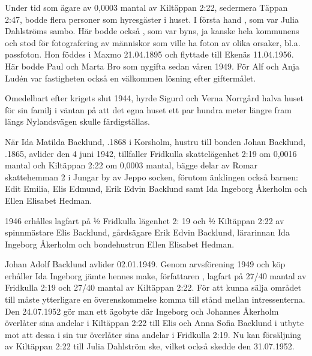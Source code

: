 Under  tid som ägare av 0,0003 mantal av Kiltäppan 2:22, sedermera Täppan 2:47, bodde flera personer som hyresgäster i huset. I första hand , som var Julia Dahlströms sambo. Här bodde också , som var byns, ja kanske hela kommunens  och stod för fotografering av människor som ville ha foton av olika orsaker, bl.a. passfoton. Hon föddes i Maxmo 21.04.1895 och flyttade till Ekenäs 11.04.1956. Här bodde Paul och Marta Bro som nygifta sedan våren 1949. För Alf och Anja Ludén var fastigheten också en välkommen lösning efter giftermålet.

Omedelbart efter krigets slut 1944, hyrde Sigurd och Verna Norrgård halva huset för sin familj i väntan på att det egna huset ett par hundra meter längre fram längs Nylandsvägen skulle färdigställas.




När Ida Matilda Backlund, .1868 i Korsholm, hustru till bonden Johan Backlund, .1865, avlider den 4 juni 1942, tillfaller Fridkulla skattelägenhet 2:19 om 0,0016 mantal och Kiltäppan 2:22 om 0,0003 mantal, bägge delar av Romar skattehemman 2 i Jungar by av Jeppo socken, förutom änklingen också barnen: Edit Emilia, Elis Edmund, Erik Edvin Backlund samt Ida Ingeborg Åkerholm och Ellen Elisabet Hedman.

1946 erhålles lagfart på ½ Fridkulla lägenhet 2: 19 och ½ Kiltäppan 2:22 av spinnmästare Elis Backlund, gårdsägare Erik Edvin Backlund, lärarinnan Ida Ingeborg Åkerholm och bondehustrun Ellen Elisabet Hedman.

Johan Adolf Backlund avlider 02.01.1949. Genom arvsförening 1949 och köp erhåller Ida Ingeborg jämte hennes make, författaren , lagfart på 27/40 mantal av Fridkulla 2:19 och 27/40 mantal av Kiltäppan 2:22. För att kunna sälja området till  måste ytterligare en överenskommelse komma till stånd mellan intressenterna. Den 24.07.1952 gör man ett ägobyte där Ingeborg och Johannes Åkerholm överlåter sina andelar i Kiltäppan 2:22 till Elis och Anna Sofia Backlund i utbyte mot att dessa i sin tur överlåter sina andelar i Fridkulla 2:19. Nu kan försäljning av Kiltäppan 2:22 till Julia Dahlström ske, vilket också skedde den 31.07.1952.

